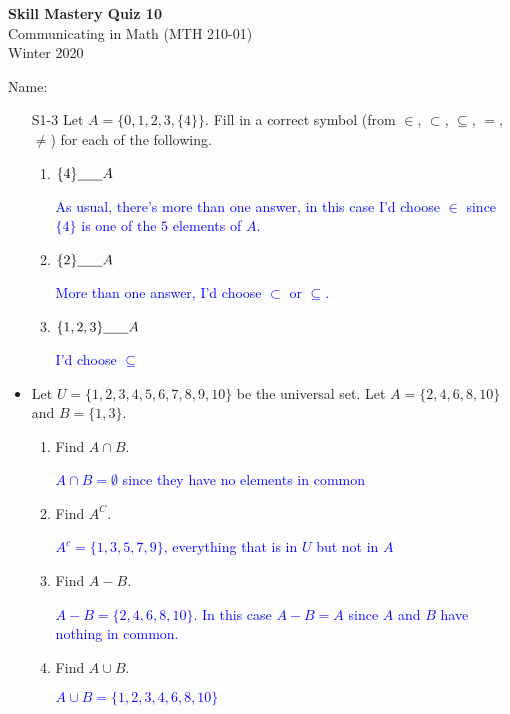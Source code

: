 \documentclass[10pt]{article}
\newcommand{\blue}{\textcolor{blue}}
\newcommand{\bs}{\begin{solution}}
\begin{document}
\vspace{-1.2in}
\begin{center} \textbf{\Large{Skill Mastery Quiz 10}} \\
Communicating in Math (MTH 210-01)\\
Winter 2020
\end{center}



\noindent Name: 




\begin{itemize}
	







\item[S1-3] Let $A = \{0,1,2,3,\{4\}\}$.  Fill in a correct symbol   (from $\in$, $\subset$, $\subseteq$, $=$, $\neq$) for each of the following.
		\begin{enumerate}
		\item $\{4\} \underline{\hspace{.25in}} A$
		\bs \blue{As usual, there's more than one answer, in this case I'd choose $\in$ since $\{4\}$ is one of the $5$ elements of $A$.}\end{solution}
		\vspace{.25in}
		\item $\{2\} \underline{\hspace{.25in}} A$
		\bs \blue{More than one answer, I'd choose $\subset$ or $\subseteq$.}\end{solution}
		\vspace{.25in}
		\item $\{1,2,3\} \underline{\hspace{.25in}}A$
		\bs\blue{I'd choose $\subseteq$}\end{solution}
		\vspace{.25in}
		\end{enumerate}


\item[S2-3] Let $U = \{1,2,3,4,5,6,7,8,9,10\}$ be the universal set.  Let $A= \{2,4,6,8,10\}$ and $B = \{1,3\}$.
		\begin{enumerate}
		\item Find $A\cap B$.
		\bs \blue{$A\cap B = \emptyset$ since they have no elements in common}\end{solution}
		\vfill
		\item Find $A^C$.
		\bs \blue{$A^c = \{ 1,3,5,7,9\}$, everything that is in $U$ but not in $A$}\end{solution}
		\vfill
		\item Find  $A-B$.
		\bs\blue{$A-B = \{2,4,6,8,10\}$. In this case $A-B = A$ since $A$ and $B$ have nothing in common.}\end{solution}
		\vfill
		\item Find $A\cup B$.
		\bs\blue{$A\cup B = \{1,2,3,4,6,8,10\}$}\end{solution}
		\vfill
		\end{enumerate}




\end{itemize}
\end{document}
